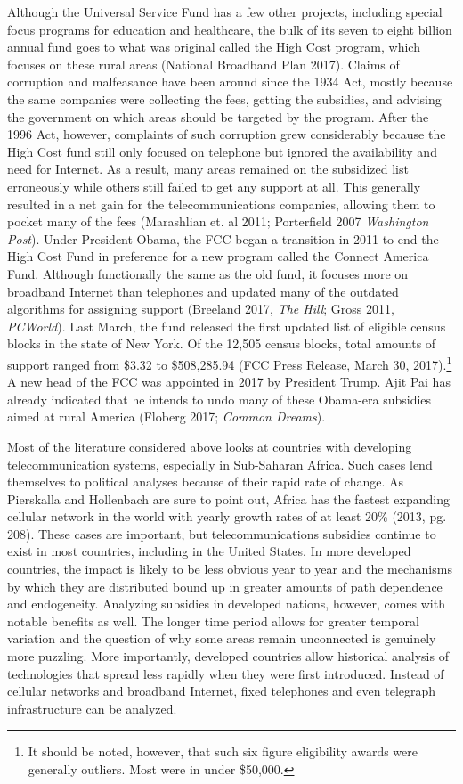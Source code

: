 \documentclass[12pt]{article}
\begin{document}
	Although the Universal Service Fund has a few other projects, including special focus programs for education and healthcare, the bulk of its seven to eight billion annual fund goes to what was original called the High Cost program, which focuses on these rural areas (National Broadband Plan 2017). Claims of corruption and malfeasance have been around since the 1934 Act, mostly because the same companies were collecting the fees, getting the subsidies, and advising the government on which areas should be targeted by the program. After the 1996 Act, however, complaints of such corruption grew considerably because the High Cost fund still only focused on telephone but ignored the availability and need for Internet. As a result, many areas remained on the subsidized list erroneously while others still failed to get any support at all. This generally resulted in a net gain for the telecommunications companies, allowing them to pocket many of the fees (Marashlian et. al 2011; Porterfield 2007 \textit{Washington Post}). Under President Obama, the FCC began a transition in 2011 to end the High Cost Fund in preference for a new program called the Connect America Fund. Although functionally the same as the old fund, it focuses more on broadband Internet than telephones and updated many of the outdated algorithms for assigning support (Breeland 2017, \textit{The Hill}; Gross 2011, \textit{PCWorld}). Last March, the fund released the first updated list of eligible census blocks in the state of New York. Of the 12,505 census blocks, total amounts of support ranged from \$3.32 to \$508,285.94 (FCC Press Release, March 30, 2017).\footnote{It should be noted, however, that such six figure eligibility awards were generally outliers. Most were in under \$50,000.} A new head of the FCC was appointed in 2017 by President Trump. Ajit Pai has already indicated that he intends to undo many of these Obama-era subsidies aimed at rural America (Floberg 2017; \textit{Common Dreams}).
		
	Most of the literature considered above looks at countries with developing telecommunication systems, especially in Sub-Saharan Africa. Such cases lend themselves to political analyses because of their rapid rate of change. As Pierskalla and Hollenbach are sure to point out, Africa has the fastest expanding cellular network in the world with yearly growth rates of at least 20\% (2013, pg. 208). These cases are important, but telecommunications subsidies continue to exist in most countries, including in the United States. In more developed countries, the impact is likely to be less obvious year to year and the mechanisms by which they are distributed bound up in greater amounts of path dependence and endogeneity. Analyzing subsidies in developed nations, however, comes with notable benefits as well. The longer time period allows for greater temporal variation and the question of why some areas remain unconnected is genuinely more puzzling. More importantly, developed countries allow historical analysis of technologies that spread less rapidly when they were first introduced. Instead of cellular networks and broadband Internet, fixed telephones and even telegraph infrastructure can be analyzed. 
	
\end{document}
